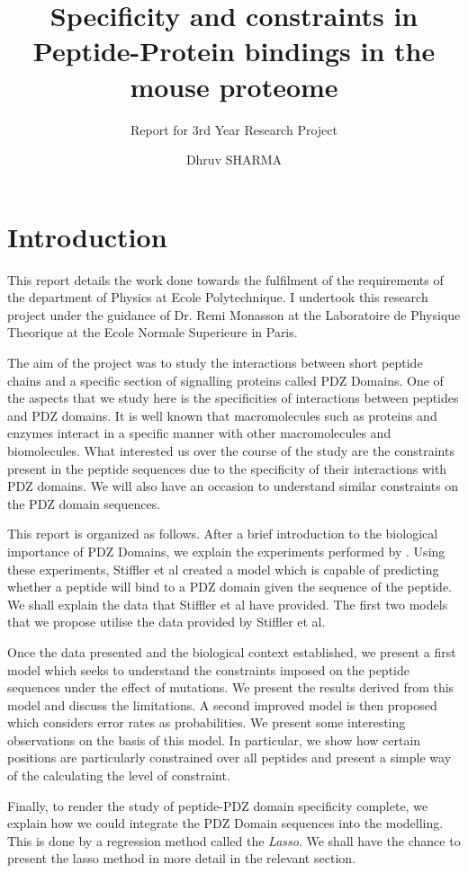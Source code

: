 \documentclass[a4paper, 12pt]{article}
\title{Specificity and constraints in Peptide-Protein bindings in the mouse proteome}
\subtitle{Report for 3rd Year Research Project}
\author{Dhruv SHARMA}
\begin{document}
\pagebreak
\maketitle
\tableofcontents
\pagebreak
\part{Introduction}
	This report details the work done towards the fulfilment of the requirements of the department of Physics at Ecole Polytechnique. I undertook this research project under the guidance of Dr. Remi Monasson at the Laboratoire de Physique Theorique at the Ecole Normale Superieure in Paris.

	\indent
	The aim of the project was to study the interactions between short peptide chains and a specific section of signalling proteins called PDZ Domains. One of the aspects that we study here is the specificities of interactions between peptides and PDZ domains. It is well known that macromolecules such as proteins and enzymes interact in a specific manner with other macromolecules and biomolecules. What interested us over the course of the study are the constraints present in the peptide sequences due to the specificity of their interactions with PDZ domains. We will also have an occasion to understand similar constraints on the PDZ domain sequences. 

	This report is organized as follows. After a brief introduction to the biological importance of PDZ Domains, we explain the experiments performed by \cite{Stiffler364}. Using these experiments, Stiffler et al created a model which is capable of predicting whether a peptide will bind to a PDZ domain given the sequence of the peptide. We shall explain the data that Stiffler et al have provided. The first two models that we propose utilise the data provided by Stiffler et al. 

	Once the data presented and the biological context established, we present a first model which seeks to understand the constraints imposed on the peptide sequences under the effect of mutations. We present the results derived from this model and discuss the limitations. A second improved model is then proposed which considers error rates as probabilities. We present some interesting observations on the basis of this model. In particular, we show how certain positions are particularly constrained over all peptides and present a simple way of the calculating the level of constraint. 

	Finally, to render the study of peptide-PDZ domain specificity complete, we explain how we could integrate the PDZ Domain sequences into the modelling. This is done by a regression method called the \textit{Lasso}. We shall have the chance to present the lasso method in more detail in the relevant section. 
\end{document}
